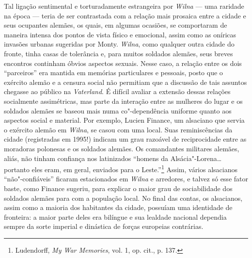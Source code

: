 Tal ligação sentimental e torturadamente estrangeira por \textit{Wilna} --- uma
raridade na época --- teria de ser contrastada com a relação mais prosaica
entre a cidade e seus ocupantes alemães, os quais, em algumas ocasiões,
se comportaram de maneira intensa dos pontos de vista físico e
emocional, assim como as oníricas invasões urbanas sugeridas por Monty.
\textit{Wilna}, como qualquer outra cidade do fronte, tinha casas de tolerância
e, para muitos soldados alemães, seus breves encontros continham óbvios
aspectos sexuais. Nesse caso, a relação entre os dois ``parceiros'' era
mantida em memórias particulares e pessoais, posto que o exército alemão
e a censura social não permitiam que a discussão de tais assuntos
chegasse ao público na \textit{Vaterland}. É difícil avaliar a extensão
dessas relações socialmente assimétricas, mas parte da interação entre
as mulheres do lugar e os soldados alemães se baseou mais numa
co"-dependência uniforme quanto aos aspectos social e material. Por
exemplo, Lucien Finance, um alsaciano que servia o exército alemão em
\textit{Wilna}, se casou com uma local. Suas reminiscências da cidade
(registradas em 1995!) indicam um grau razoável de reciprocidade entre
as moradoras polonesas e os soldados alemães. Os comandantes militares
alemães, aliás, não tinham confiança nos latinizados ``homens da
Alsácia"-Lorena\ldots{} portanto eles eram, em geral, enviados para o
Leste.''\footnote{Ludendorff, \textit{My War Memories}, vol. 1, op. cit., p. 137.} Assim, vários alsacianos ``não"-confiáveis'' ficaram estacionados em \textit{Wilna} e arredores, e talvez só esse fator baste, como
Finance sugeriu, para explicar o maior grau de sociabilidade dos
soldados alemães para com a população local. No final das contas, os
alsacianos, assim como a maioria dos habitantes da cidade, possuíam uma
identidade de fronteira: a maior parte deles era bilíngue e sua lealdade
nacional dependia sempre da sorte imperial e dinástica de forças
europeias contrárias.

%

